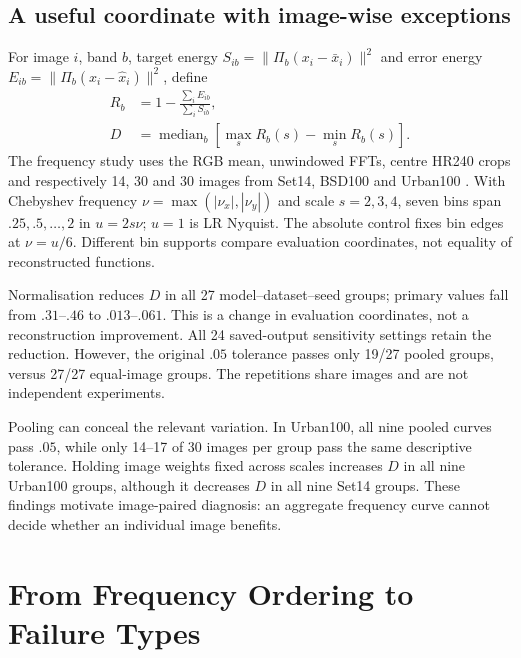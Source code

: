 \subsection{A useful coordinate with image-wise exceptions}
For image $i$, band $b$, target energy $S_{ib}=\|\Pi_b(x_i-\bar x_i)\|^2$
and error energy $E_{ib}=\|\Pi_b(x_i-\hat x_i)\|^2$, define
\begin{equation}
\begin{aligned}
 R_b&=1-\frac{\sum_i E_{ib}}{\sum_i S_{ib}},\\
 D&=\operatorname{median}_b[\max_s R_b(s)-\min_s R_b(s)].
\end{aligned}
 \label{eq:recovery}
\end{equation}
The frequency study uses the RGB mean, unwindowed FFTs, centre HR240
crops and respectively 14, 30 and 30 images from Set14, BSD100 and Urban100
\cite{zeyde2010single,martin2001database,huang2015urban}. With Chebyshev
frequency $\nu=\max(|\nu_x|,|\nu_y|)$ and scale $s=2,3,4$, seven bins
span $.25,.5,\ldots,2$ in $u=2s\nu$; $u=1$ is LR Nyquist. The absolute
control fixes bin edges at $\nu=u/6$. Different bin supports compare
evaluation coordinates, not equality of reconstructed functions.

Normalisation reduces $D$ in all 27 model--dataset--seed groups;
primary values fall from $.31$--$.46$ to $.013$--$.061$. This is a change
in evaluation coordinates, not a reconstruction improvement. All 24 saved-output
sensitivity settings retain the reduction. However, the original $.05$
tolerance passes only 19/27 pooled groups, versus 27/27 equal-image groups.
The repetitions share images and are not independent experiments.

Pooling can conceal the relevant variation. In Urban100, all nine pooled
curves pass $.05$, while only 14--17 of 30 images per group pass the same
descriptive tolerance. Holding image weights fixed across scales increases
$D$ in all nine Urban100 groups, although it decreases $D$ in all nine
Set14 groups. These findings motivate image-paired diagnosis: an aggregate
frequency curve cannot decide whether an individual image benefits.

\section{From Frequency Ordering to Failure Types}
\label{sec:failure}
